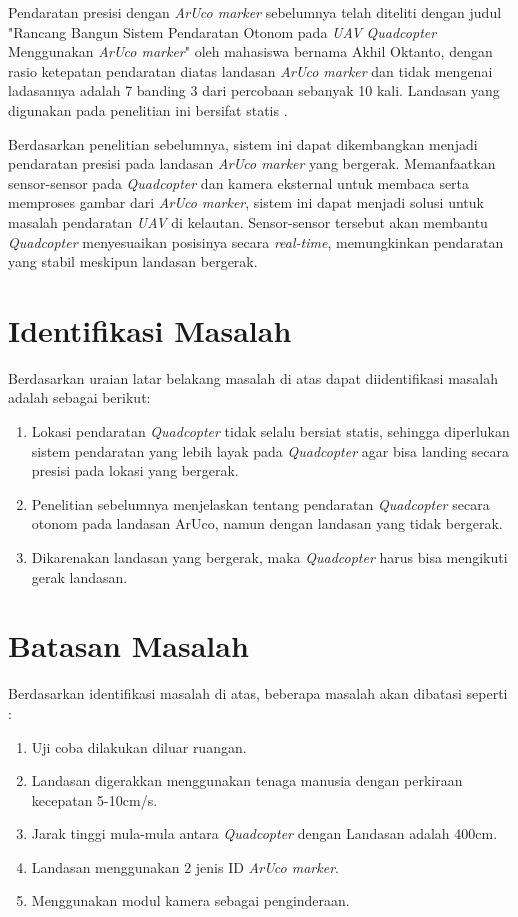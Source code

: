 Pendaratan presisi dengan \textit{ArUco marker} sebelumnya telah diteliti dengan judul "Rancang Bangun Sistem Pendaratan Otonom pada \textit{UAV} \textit{Quadcopter} Menggunakan \textit{ArUco marker}" oleh mahasiswa bernama Akhil Oktanto, dengan rasio ketepatan pendaratan diatas landasan \textit{ArUco marker} dan tidak mengenai ladasannya adalah 7 banding 3 dari percobaan sebanyak 10 kali. Landasan yang digunakan pada penelitian ini bersifat statis \citep{akhiloktantoqc}.

Berdasarkan penelitian sebelumnya, sistem ini dapat dikembangkan menjadi pendaratan presisi pada landasan \textit{ArUco marker} yang bergerak. Memanfaatkan sensor-sensor pada \textit{Quadcopter} dan kamera eksternal untuk membaca serta memproses gambar dari \textit{ArUco marker}, sistem ini dapat menjadi solusi untuk masalah pendaratan \textit{UAV} di kelautan. Sensor-sensor tersebut akan membantu \textit{Quadcopter} menyesuaikan posisinya secara \textit{real-time}, memungkinkan pendaratan yang stabil meskipun landasan bergerak.

\section{Identifikasi Masalah}
Berdasarkan uraian latar belakang masalah di atas dapat diidentifikasi masalah adalah sebagai berikut:
\begin{enumerate}
	\item Lokasi pendaratan \textit{Quadcopter} tidak selalu bersiat statis, sehingga diperlukan sistem pendaratan yang lebih layak pada \textit{Quadcopter} agar bisa landing secara presisi pada lokasi yang bergerak.
	\item Penelitian sebelumnya menjelaskan tentang pendaratan \textit{Quadcopter} secara otonom pada landasan ArUco, namun dengan landasan yang tidak bergerak.
	\item Dikarenakan landasan yang bergerak, maka \textit{Quadcopter} harus bisa mengikuti gerak landasan.
\end{enumerate}

\section{Batasan Masalah}
Berdasarkan identifikasi masalah di atas, beberapa masalah akan dibatasi seperti :
\begin{enumerate}
	\item Uji coba dilakukan diluar ruangan.
	\item Landasan digerakkan menggunakan tenaga manusia dengan perkiraan kecepatan 5-10cm/s.
	\item Jarak tinggi mula-mula antara \textit{Quadcopter} dengan Landasan adalah 400cm.
	\item Landasan menggunakan 2 jenis ID \textit{ArUco marker}.
	\item Menggunakan modul kamera sebagai penginderaan.
\end{enumerate}


